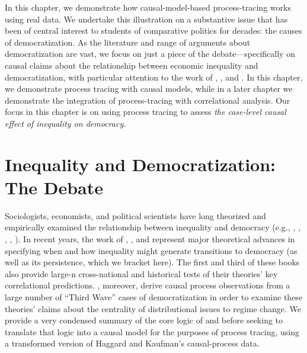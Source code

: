 \documentclass[
  12pt,
]{book}
\begin{document}
In this chapter, we demonstrate how causal-model-based process-tracing works using real data. We undertake this illustration on a substantive issue that has been of central interest to students of comparative politics for decades: the causes of democratization. As the literature and range of arguments about democratization are vast, we focus on just a piece of the debate---specifically on causal claims about the relationship between economic inequality and democratization, with particular attention to the work of \citet{boix2003democracy}, \citet{acemoglu2005economic}, and \citet{haggard2012inequality}. In this chapter, we demonstrate process tracing with causal models, while in a later chapter we demonstrate the integration of process-tracing with correlational analysis. Our focus in this chapter is on using process tracing to assess \emph{the case-level causal effect of inequality on democracy.}

\hypertarget{inequality-and-democratization-the-debate}{%
\section{Inequality and Democratization: The Debate}\label{inequality-and-democratization-the-debate}}

Sociologists, economists, and political scientists have long theorized and empirically examined the relationship between inequality and democracy (e.g., \citet{dahl1973polyarchy}, \citet{bollen1985political}, \citet{acemoglu2005economic}, \citet{boix2003democracy}, \citet{ansell2014inequality}). In recent years, the work of \citet{boix2003democracy}, \citet{acemoglu2005economic}, and \citet{ansell2014inequality} represent major theoretical advances in specifying when and how inequality might generate transitions to democracy (as well as its persistence, which we bracket here). The first and third of these books also provide large-n cross-national and historical tests of their theories' key correlational predictions. \citet{haggard2012inequality}, moreover, derive causal process observations from a large number of ``Third Wave'' cases of democratization in order to examine these theories' claims about the centrality of distributional issues to regime change. We provide a very condensed summary of the core logic of \citet{boix2003democracy} and \citet{acemoglu2005economic} before seeking to translate that logic into a causal model for the purposes of process tracing, using a transformed version of Haggard and Kaufman's causal-process data.
\end{document}
